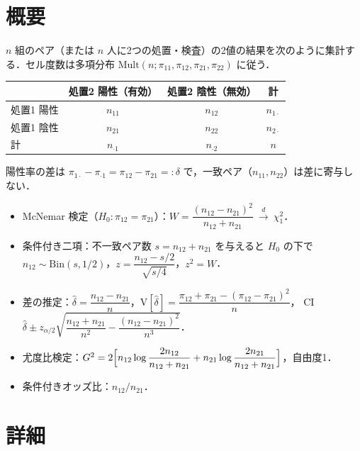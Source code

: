 \documentclass[a4paper,11pt,openany]{ltjsbook}
\newcommand{\V}{\mathrm{V}}
\newcommand{\Bin}{\mathrm{Bin}}
\begin{document}
\section{概要}\label{sec:m06-gaiyo}
$n$ 組のペア（または $n$ 人に2つの処置・検査）の2値の結果を次のように集計する．セル度数は多項分布 $\mathrm{Mult}(n;\pi_{11},\pi_{12},\pi_{21},\pi_{22})$ に従う．
\begin{center}\small
\begin{tabular}{@{}lccc@{}}
\toprule
 & 処置2 陽性（有効） & 処置2 陰性（無効） & 計\\
\midrule
処置1 陽性 & $n_{11}$ & $n_{12}$ & $n_{1\cdot}$\\
処置1 陰性 & $n_{21}$ & $n_{22}$ & $n_{2\cdot}$\\
\midrule
計 & $n_{\cdot1}$ & $n_{\cdot2}$ & $n$\\
\bottomrule
\end{tabular}
\end{center}
陽性率の差は $\pi_{1\cdot}-\pi_{\cdot1}=\pi_{12}-\pi_{21}=:\delta$ で，一致ペア（$n_{11},n_{22}$）は差に寄与しない．
\begin{pointbox}[覚える式]
\begin{itemize}
\item McNemar 検定（$H_0:\pi_{12}=\pi_{21}$）：$W=\dfrac{(n_{12}-n_{21})^2}{n_{12}+n_{21}}\ \xrightarrow{d}\ \chi^2_1$．
\item 条件付き二項：不一致ペア数 $s=n_{12}+n_{21}$ を与えると $H_0$ の下で $n_{12}\sim\Bin(s,1/2)$，$z=\dfrac{n_{12}-s/2}{\sqrt{s/4}}$，$z^2=W$．
\item 差の推定：$\hat\delta=\dfrac{n_{12}-n_{21}}{n}$，$\V[\hat\delta]=\dfrac{\pi_{12}+\pi_{21}-(\pi_{12}-\pi_{21})^2}{n}$，
      CI $\hat\delta\pm z_{\alpha/2}\sqrt{\dfrac{n_{12}+n_{21}}{n^2}-\dfrac{(n_{12}-n_{21})^2}{n^3}}$．
\item 尤度比検定：$G^2=2\Bigl[n_{12}\log\dfrac{2n_{12}}{n_{12}+n_{21}}+n_{21}\log\dfrac{2n_{21}}{n_{12}+n_{21}}\Bigr]$，自由度1．
\item 条件付きオッズ比：$n_{12}/n_{21}$．
\end{itemize}
\end{pointbox}

\section{詳細}\label{sec:m06-shosai}
\end{document}
